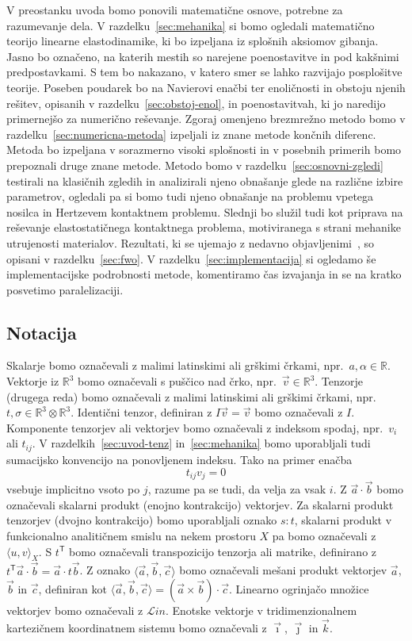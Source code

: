\documentclass[12pt,a4paper,twoside]{article}
\theoremstyle{definition} %
\theoremstyle{plain} %
\numberwithin{equation}{section}
\newcommand{\R}{\mathbb R}
\newcommand{\T}{\mathsf{T}}
\newcommand{\Lin}{\mathcal{L}in}
\newcommand{\vv}{\vec{v}}
\newcommand{\va}{\vec{a}}
\newcommand{\vc}{\vec{c}}
\newcommand{\vb}{\vec{b}}
\newcommand{\vi}{\vec{\imath}}
\newcommand{\vj}{\vec{\jmath}}
\newcommand{\vk}{\vec{k}}
\begin{document}
V preostanku uvoda bomo ponovili matematične osnove, potrebne za razumevanje dela.  V
razdelku~\ref{sec:mehanika} si bomo ogledali matematično teorijo linearne elastodinamike, ki bo
izpeljana iz splošnih aksiomov gibanja. Jasno bo označeno, na katerih mestih so narejene
poenostavitve in pod kakšnimi predpostavkami. S tem bo nakazano, v katero smer se lahko razvijajo
posplošitve teorije. Poseben poudarek bo na Navierovi enačbi ter enoličnosti in obstoju njenih
rešitev, opisanih v razdelku~\ref{sec:obstoj-enol}, in poenostavitvah, ki jo naredijo primernejšo za
numerično reševanje. Zgoraj omenjeno brezmrežno metodo bomo v razdelku~\ref{sec:numericna-metoda}
izpeljali iz znane metode končnih diferenc. Metoda bo izpeljana v sorazmerno visoki splošnosti in v
posebnih primerih bomo prepoznali druge znane metode.  Metodo bomo v
razdelku~\ref{sec:osnovni-zgledi} testirali na klasičnih zgledih in analizirali njeno obnašanje
glede na različne izbire parametrov, ogledali pa si bomo tudi njeno obnašanje na problemu vpetega
nosilca in Hertzevem kontaktnem problemu. Slednji bo služil tudi kot priprava na reševanje
elastostatičnega kontaktnega problema, motiviranega s strani mehanike utrujenosti materialov.
Rezultati, ki se ujemajo z nedavno objavljenimi~\cite{pereira2016convergence}, so opisani v
razdelku~\ref{sec:fwo}. V razdelku~\ref{sec:implementacija} si ogledamo še implementacijske
podrobnosti metode, komentiramo čas izvajanja in se na kratko posvetimo paralelizaciji.

\subsection{Notacija}
Skalarje bomo označevali z malimi latinskimi ali grškimi črkami, npr.~$a, \alpha
\in \R$. Vektorje iz $\R^3$ bomo označevali s puščico nad črko, npr.~$\vv \in
\R^3$. Tenzorje (drugega reda) bomo označevali z malimi latinskimi ali grškimi
črkami, npr.~$t, \sigma \in \R^3\otimes\R^3$. Identični tenzor, definiran z $I\vv = \vv$ bomo
označevali z $I$. Komponente tenzorjev ali vektorjev bomo označevali z indeksom spodaj, npr.~$v_i$
ali $t_{ij}$. V razdelkih~\ref{sec:uvod-tenz} in~\ref{sec:mehanika} bomo uporabljali tudi
sumacijsko konvencijo na ponovljenem indeksu. Tako na primer enačba
\[
  t_{ij}v_j = 0
\]
vsebuje implicitno vsoto po $j$, razume pa se tudi, da velja za vsak $i$. Z $\va\cdot\vb$ bomo
označevali skalarni produkt (enojno kontrakcijo) vektorjev. Za skalarni produkt tenzorjev (dvojno
kontrakcijo) bomo uporabljali oznako $s:t$, skalarni produkt v funkcionalno analitičnem smislu na
nekem prostoru $X$ pa bomo označevali z $\langle u, v\rangle_X$. S $t^\T$ bomo označevali
transpozicijo tenzorja ali matrike, definirano z $t^\T\va \cdot \vb = \va\cdot t\vb$. Z oznako
$\langle \va, \vb, \vc\rangle$ bomo označevali mešani produkt vektorjev $\va$, $\vb$ in $\vc$,
definiran kot $\langle \va, \vb, \vc\rangle = (\va\times\vb)\cdot \vc$.
Linearno ogrinjačo množice vektorjev bomo označevali z $\Lin$. Enotske vektorje v tridimenzionalnem
kartezičnem koordinatnem sistemu bomo označevali z $\vi$, $\vj$ in $\vk$.
\end{document}
